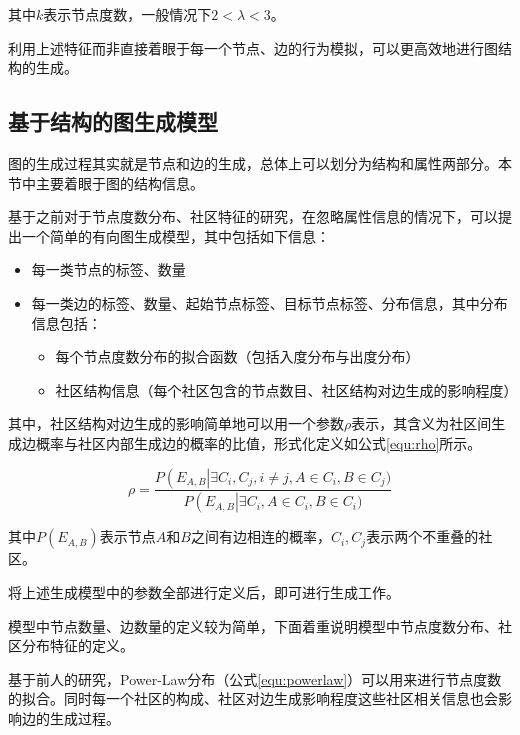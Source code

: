 \noindent 其中$k$表示节点度数，一般情况下$2<\lambda<3$。

利用上述特征而非直接着眼于每一个节点、边的行为模拟，可以更高效地进行图结构的生成。

\subsection{基于结构的图生成模型}
\label{cap:simplegen}

图的生成过程其实就是节点和边的生成，总体上可以划分为结构和属性两部分。本节中主要着眼于图的结构信息。

基于之前对于节点度数分布、社区特征的研究，在忽略属性信息的情况下，可以提出一个简单的有向图生成模型，其中包括如下信息\cite{FastSGG}：

\begin{itemize}
    \item 每一类节点的标签、数量
    \item 每一类边的标签、数量、起始节点标签、目标节点标签、分布信息，其中分布信息包括：
    \begin{itemize}
        \item 每个节点度数分布的拟合函数（包括入度分布与出度分布）
        \item 社区结构信息（每个社区包含的节点数目、社区结构对边生成的影响程度）
    \end{itemize}
\end{itemize}

\vspace{0.2cm}

其中，社区结构对边生成的影响简单地可以用一个参数$\rho$表示，其含义为社区间生成边概率与社区内部生成边的概率的比值，形式化定义如公式\ref{equ:rho}所示。

\vspace{-8mm}

\begin{equation}[H]
    \label{equ:rho}
    \rho = \frac{P\left(E_{A,B}\right|\exists C_i, C_j, i\ne j, A\in C_i, B\in C_j)}{P\left(E_{A,B}\right|\exists C_i, A\in C_i, B\in C_i)}
\end{equation}

\noindent 其中$P\left(E_{A,B}\right)$表示节点$A$和$B$之间有边相连的概率，$C_i, C_j$表示两个不重叠的社区。

将上述生成模型中的参数全部进行定义后，即可进行生成工作。

模型中节点数量、边数量的定义较为简单，下面着重说明模型中节点度数分布、社区分布特征的定义。

基于前人的研究，Power-Law分布（公式\ref{equ:powerlaw}）可以用来进行节点度数的拟合。同时每一个社区的构成、社区对边生成影响程度这些社区相关信息也会影响边的生成过程。


